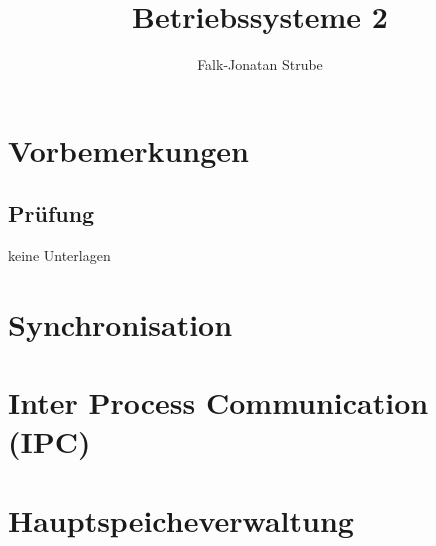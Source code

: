 \documentclass{scrreprt}
\title{Betriebssysteme 2}
\author{Falk-Jonatan Strube}
\begin{document}
\maketitle
\newpage
\tableofcontents
\newpage

\chapter*{Vorbemerkungen}

\section*{Prüfung}
keine Unterlagen

\chapter{Synchronisation}


\chapter{Inter Process Communication (IPC)}


\chapter{Hauptspeicheverwaltung}





\end{document}

